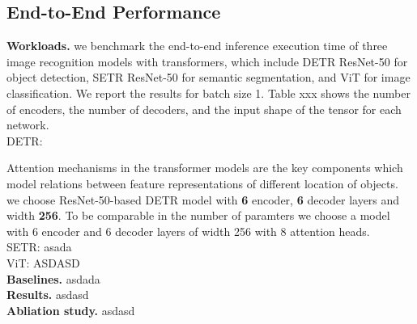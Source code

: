 \subsection{End-to-End Performance}
\textbf{Workloads.} we benchmark the end-to-end inference execution time of three image recognition models with transformers, which include DETR ResNet-50
for object detection, SETR ResNet-50 for semantic segmentation, and ViT for image classification. We report the results for batch size 1. Table xxx shows the 
number of encoders, the number of decoders, and the input shape of the tensor for each network. \\



{\color{red} DETR:}

Attention mechanisms in the transformer models are the key components which model relations between feature representations of different location of objects.
we choose ResNet-50-based DETR model with \textbf{6} encoder, \textbf{6} decoder layers and width \textbf{256}. 
To be comparable in the number of paramters we choose a model with 6 encoder and 6 decoder layers of width 256 with 8 attention heads. \\

{\color{red} SETR:}
asada \\

{\color{red} ViT:}
ASDASD \\



\textbf{Baselines.} asdada \\
\textbf{Results.} asdasd \\
\textbf{Abliation study.} asdasd \\



\label{sec:result}

